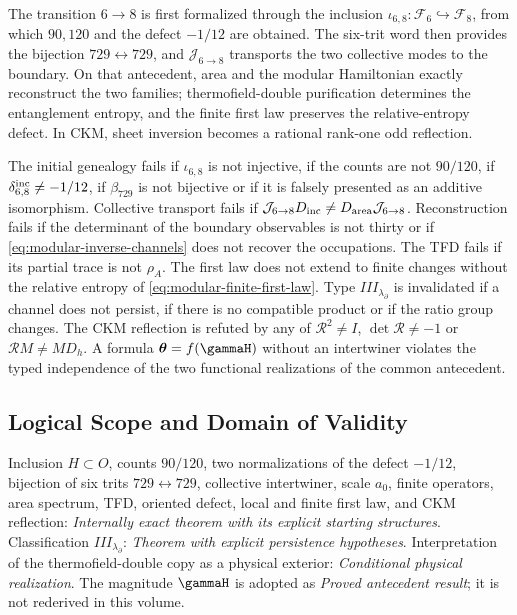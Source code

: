 \begin{proposition}
The transition \(6\to8\) is first formalized through the inclusion
\(\iota_{6,8}:\mathcal F_6\hookrightarrow\mathcal F_8\), from which
\(90,120\) and the defect \(-1/12\) are
obtained. The six-trit word then provides the bijection \(729\leftrightarrow729\), and
\(\mathcal J_{6\to8}\) transports the two collective modes to the boundary. On
that antecedent, area and the modular Hamiltonian exactly reconstruct
the two families; thermofield-double purification determines the entanglement entropy,
and the finite first law
preserves the relative-entropy defect. In CKM, sheet inversion
becomes a rational rank-one odd reflection.
\end{proposition}

\begin{remark}
The initial genealogy fails if \(\iota_{6,8}\) is not injective, if the
counts are not \(90/120\), if \(\delta_{6,8}^{\rm inc}\neq-1/12\), if
\(\beta_{729}\) is not bijective or if it is falsely presented as an
additive isomorphism. Collective transport fails if
\(\mathcal J_{6\to8}D_{\rm inc}\neq
D_{\rm area}\mathcal J_{6\to8}\). Reconstruction fails if the
determinant of the boundary observables is not thirty or if
\cref{eq:modular-inverse-channels} does not recover the occupations.
The TFD fails if its partial trace is not \(\rho_A\). The first law does not
extend to finite changes without the relative entropy of
\cref{eq:modular-finite-first-law}. Type
\(III_{\lambda_\partial}\) is invalidated if a channel does not persist, if there is no
compatible product or if the ratio group changes. The CKM reflection
is refuted by any of
\(\mathcal R^2\neq I\), \(\det\mathcal R\neq-1\) or
\(\mathcal RM\neq MD_h\). A formula
\(\boldsymbol\theta=f(\gammaH)\) without an intertwiner violates the typed
independence of the two functional realizations of the common antecedent.
\end{remark}

\subsection*{Logical Scope and Domain of Validity}
Inclusion \(H\subset O\), counts \(90/120\), two normalizations of the
defect \(-1/12\), bijection of six trits \(729\leftrightarrow729\),
collective intertwiner, scale \(a_0\), finite operators, area spectrum,
TFD, oriented defect, local and finite first law, and CKM reflection:
\emph{Internally exact theorem with its explicit starting structures}.
Classification
\(III_{\lambda_\partial}\): \emph{Theorem with explicit
persistence hypotheses}. Interpretation of the thermofield-double copy as a physical exterior:
\emph{Conditional physical realization}. The magnitude \(\gammaH\) is adopted
as \emph{Proved antecedent result}; it is not rederived in this volume.

